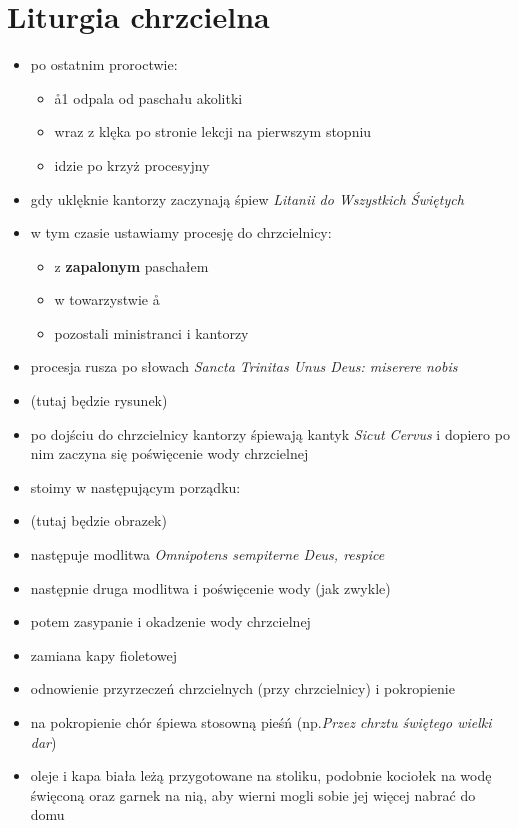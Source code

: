 \section{Liturgia chrzcielna}

	\begin{itemize}
		\item po ostatnim proroctwie:
			\begin{itemize}
				\item \aa1 odpala od paschału akolitki
				\item \ii wraz z \cc klęka po stronie lekcji na pierwszym stopniu
				\item {} idzie po krzyż procesyjny
			\end{itemize}
		\item gdy \ii uklęknie kantorzy zaczynają śpiew \textit{Litanii do Wszystkich Świętych}
		\item w tym czasie ustawiamy procesję do chrzcielnicy:
			\begin{itemize}
				\item {} z \textbf{zapalonym} paschałem
				\item {} w towarzystwie \aa
				\item pozostali ministranci i kantorzy
			\end{itemize}
		\item procesja rusza po słowach \textit{Sancta Trinitas Unus Deus: miserere nobis}
		\item (tutaj będzie rysunek)
		\item po dojściu do chrzcielnicy kantorzy śpiewają kantyk \textit{Sicut Cervus} i dopiero po nim zaczyna się poświęcenie wody chrzcielnej
		\item stoimy w następującym porządku:
		\item (tutaj będzie obrazek)
		\item następuje modlitwa \textit{Omnipotens sempiterne Deus, respice}
		\item następnie druga modlitwa i poświęcenie wody (jak zwykle)
		\item potem zasypanie i okadzenie wody chrzcielnej
		\item zamiana kapy fioletowej 
		\item odnowienie przyrzeczeń chrzcielnych (przy chrzcielnicy) i pokropienie
		\item na pokropienie chór śpiewa stosowną pieśń (np.\textit{Przez chrztu świętego wielki dar})
		\item oleje i kapa biała leżą przygotowane na stoliku, podobnie kociołek na wodę święconą oraz garnek na nią, aby wierni mogli sobie jej więcej nabrać do domu

\end{itemize}
